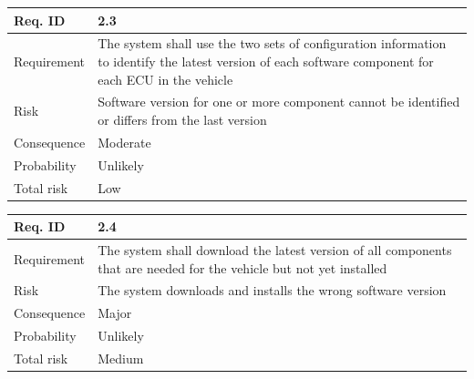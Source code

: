 
\begin{table}[H]
\centering
\begin{tabularx}{1.0\textwidth}{
    |p{}%
    |p{}|%
}
\hline

Req. ID
& 2.3
\\
\hline

Requirement
& The system shall use the two sets of configuration information to identify the latest version of each software component for each ECU in the vehicle
\\
\hline

Risk
& 
Software version for one or more component cannot be identified or differs from the last version
\\
\hline

Consequence
&
Moderate
\\
\hline

Probability
&
Unlikely
\\
\hline

Total risk
&
Low
\\
\hline

\end{tabularx}
\end{table}


\begin{table}[H]
\centering
\begin{tabularx}{1.0\textwidth}{
    |p{}%
    |p{}|%
}
\hline

Req. ID
& 2.4
\\
\hline

Requirement
& The system shall download the latest version of all components that are needed for the vehicle but not yet installed 
\\
\hline

Risk
& 
The system downloads and installs the wrong software version
\\
\hline

Consequence
&
Major
\\
\hline

Probability
&
Unlikely
\\
\hline

Total risk
&
Medium
\\
\hline

\end{tabularx}
\end{table}

